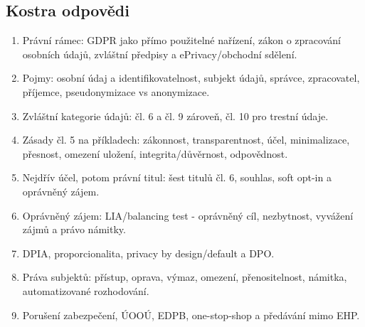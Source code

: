 

\newpage

\iffalse
{}

\subsection*{Kostra odpovědi}
\begin{enumerate}
  \item Právní rámec: GDPR jako přímo použitelné nařízení, zákon o zpracování osobních údajů, zvláštní předpisy a ePrivacy/obchodní sdělení.
  \item Pojmy: osobní údaj a identifikovatelnost, subjekt údajů, správce, zpracovatel, příjemce, pseudonymizace vs anonymizace.
  \item Zvláštní kategorie údajů: čl. 6 a čl. 9 zároveň, čl. 10 pro trestní údaje.
  \item Zásady čl. 5 na příkladech: zákonnost, transparentnost, účel, minimalizace, přesnost, omezení uložení, integrita/důvěrnost, odpovědnost.
  \item Nejdřív účel, potom právní titul: šest titulů čl. 6, souhlas, soft opt-in a oprávněný zájem.
  \item Oprávněný zájem: LIA/balancing test - oprávněný cíl, nezbytnost, vyvážení zájmů a právo námitky.
  \item DPIA, proporcionalita, privacy by design/default a DPO.
  \item Práva subjektů: přístup, oprava, výmaz, omezení, přenositelnost, námitka, automatizované rozhodování.
  \item Porušení zabezpečení, ÚOOÚ, EDPB, one-stop-shop a předávání mimo EHP.
\end{enumerate}

